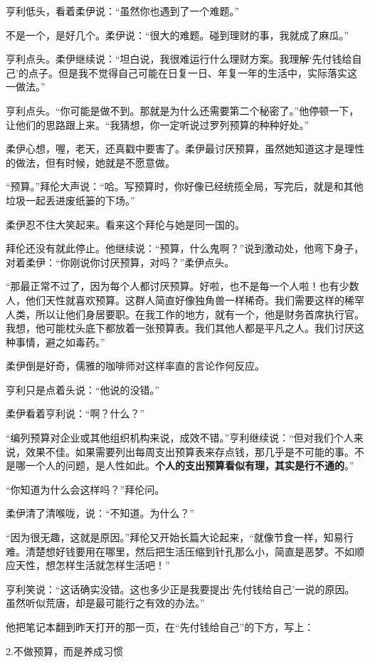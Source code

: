 亨利低头，看着柔伊说：“虽然你也遇到了一个难题。”

不是一个，是好几个。柔伊说：“很大的难题。碰到理财的事，我就成了麻瓜。”

亨利点头。柔伊继续说：“坦白说，我很难运行什么理财方案。我理解‘先付钱给自己’的点子。但是我不觉得自己可能在日复一日、年复一年的生活中，实际落实这一做法。”

亨利点头。“你可能是做不到。那就是为什么还需要第二个秘密了。”他停顿一下，让他们的思路跟上来。“我猜想，你一定听说过罗列预算的种种好处。”

柔伊心想，喔，老天，还真戳中要害了。柔伊最讨厌预算，虽然她知道这才是理性的做法，但有时候，她就是不愿意做。

“预算。”拜伦大声说：“哈。写预算时，你好像已经统揽全局，写完后，就是和其他垃圾一起丢进废纸篓的下场。”

柔伊忍不住大笑起来。看来这个拜伦与她是同一国的。

拜伦还没有就此停止。他继续说：“预算，什么鬼啊？”说到激动处，他弯下身子，对着柔伊：“你刚说你讨厌预算，对吗？”柔伊点头。

“那最正常不过了，因为每个人都讨厌预算。好啦，也不是每一个人啦！也有少数人，他们天性就喜欢预算。这群人简直好像独角兽一样稀奇。我们需要这样的稀罕人类，所以让他们身居要职。在我工作的地方，就有一个，他是财务首席执行官。我想，他可能枕头底下都放着一张预算表。我们其他人都是平凡之人。我们讨厌这种事情，避之如毒药。”

柔伊倒是好奇，儒雅的咖啡师对这样率直的言论作何反应。

亨利只是点着头说：“他说的没错。”

柔伊看着亨利说：“啊？什么？”

“编列预算对企业或其他组织机构来说，成效不错。”亨利继续说：“但对我们个人来说，效果不佳。如果需要列出每周支出预算表来存点钱，那几乎是不可能的事。不是哪一个人的问题，是人性如此。\textbf{个人的支出预算看似有理，其实是行不通的}。”

“你知道为什么会这样吗？”拜伦问。

柔伊清了清喉咙，说：“不知道。为什么？”

“因为很无趣，这就是原因。”拜伦又开始长篇大论起来，“就像节食一样，知易行难。清楚想好钱要用在哪里，然后把生活压缩到针孔那么小，简直是恶梦。不如顺应天性，想怎样生活就怎样生活吧！”

亨利笑说：“这话确实没错。这也多少正是我要提出‘先付钱给自己’一说的原因。虽然听似荒唐，却是最可能行之有效的办法。”

他把笔记本翻到昨天打开的那一页，在“先付钱给自己”的下方，写上：

{\kaishu 2.不做预算，而是养成习惯}


